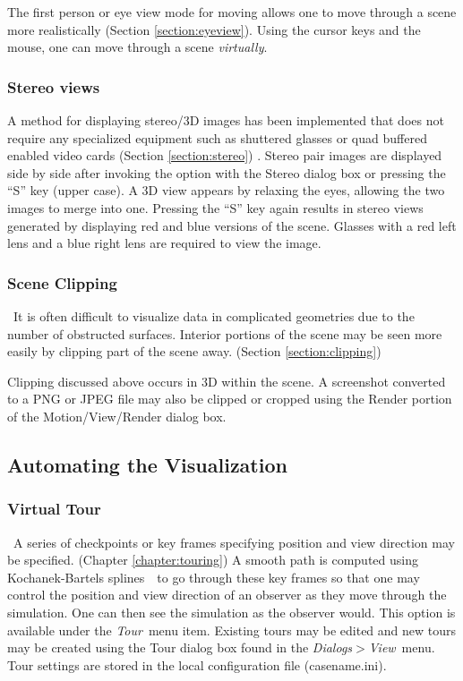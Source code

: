 \documentclass[11pt,twoside]{book}
\begin{document}
The first person or eye view mode for moving
allows one to move through a scene more
realistically (Section \ref{section:eyeview}).  Using the cursor keys and the
mouse, one can move through a scene {\em virtually}.

\subsubsection{Stereo views}A method for displaying stereo/3D
images has been implemented that does
not require any specialized equipment such as shuttered glasses or
quad buffered enabled video cards (Section \ref{section:stereo}) .
Stereo pair images are displayed side by side after invoking the option with
the Stereo dialog box or pressing the ``S'' key (upper case).
A 3D view appears by relaxing the eyes, allowing the two images to merge into one.
Pressing the ``S'' key again results in stereo views generated by
displaying red and blue versions of the scene.
Glasses with a red left lens and a blue right lens are required to view the image.

\subsubsection{Scene Clipping}\ It is often difficult to visualize data
in complicated geometries due to the number of obstructed
surfaces. Interior portions of the scene may be seen more easily
by clipping part of the scene away. (Section
\ref{section:clipping})

Clipping discussed above occurs in 3D within the scene.  A
screenshot converted to a PNG or JPEG file may also be clipped or
cropped using the Render portion of the Motion/View/Render
dialog box.

\subsection{Automating the Visualization}
\subsubsection{Virtual Tour}\   A series of checkpoints or key frames
specifying position and view direction may be specified. (Chapter
\ref{chapter:touring}) A smooth path is computed using
Kochanek-Bartels splines~\cite{Moller:02}\ to go through these key
frames so that one may control the position and view direction of
an observer as they move through the simulation. One can then see
the simulation as the observer would. This option is available
under the {\em Tour}\ menu item. Existing tours may be edited and
new tours may be created using the Tour dialog box found in
the {\em Dialogs$>$View}\ menu. Tour settings are stored in the local
configuration file (casename.ini).
\end{document}
